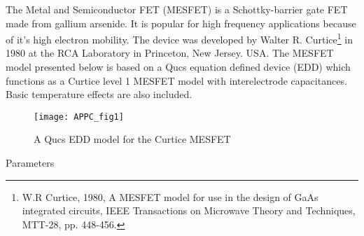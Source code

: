 %
%
%
%


The Metal and Semiconductor FET (MESFET) is a Schottky-barrier gate
FET made from gallium arsenide. It is popular for high frequency
applications because of it's high electron mobility. The device was
developed by Walter R. Curtice\footnote{W.R Curtice, 1980, A MESFET
model for use in the design of GaAs integrated circuits, IEEE
Transactions on Microwave Theory and Techniques, MTT-28, pp. 448-456.}
in 1980 at the RCA Laboratory in Princeton, New Jersey. USA.  The
MESFET model presented below is based on a Qucs equation defined
device (EDD) which functions as a Curtice level 1 MESFET model with
interelectrode capacitances. Basic temperature effects are also
included.

\begin{figure}
  \centering 
  \texttt{[image: APPC\_fig1]}
  \caption{A Qucs EDD model for the Curtice MESFET}
  \label{fig:APPC_fig1}
\end{figure} 

Parameters

